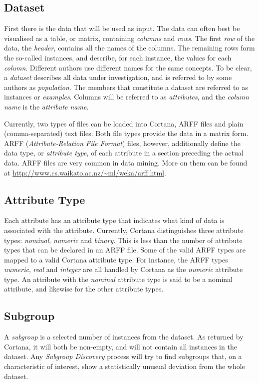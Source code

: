 \documentclass{article}
\begin{document}
\subsection{Dataset}
\label{preliminaries:dataset}
First there is the data that will be used as input.
The data can often best be visualised as a table, or matrix, containing \emph{columns} and \emph{rows}.
The first \emph{row} of the data, the \emph{header}, contains all the names of the columns.
The remaining rows form the so-called instances, and describe, for each instance, the values for each \emph{column}.
Different authors use different names for the same concepts.
To be clear, a \emph{dataset} describes all data under investigation, and is referred to by some authors as \emph{population}.
The members that constitute a dataset are referred to as instances or \emph{examples}.
Columns will be referred to as \emph{attributes}, and the \emph{column name} is the \emph{attribute name}.

Currently, two types of files can be loaded into Cortana, ARFF files and plain (comma-separated) text files.
Both file types provide the data in a matrix form.
ARFF (\emph{Attribute-Relation File Format}) files, however, additionally define the data type, or \emph{attribute type}, of each attribute in a section preceding the actual data.
ARFF files are very common in data mining.
More on them can be found at \url{http://www.cs.waikato.ac.nz/~ml/weka/arff.html}.



\subsection{Attribute Type}
\label{preliminaries:attribute-type}
Each attribute has an attribute type that indicates what kind of data is associated with the attribute.
Currently, Cortana distinguishes three attribute types: \emph{nominal}, \emph{numeric} and \emph{binary}.
This is less than the number of attribute types that can be declared in an ARFF file.
Some of the valid ARFF types are mapped to a valid Cortana attribute type.
For instance, the ARFF types \emph{numeric}, \emph{real} and \emph{integer} are all handled by Cortana as the \emph{numeric} attribute type.
An attribute with the \emph{nominal} attribute type is said to be a nominal attribute, and likewise for the other attribute types.



\subsection{Subgroup}
\label{preliminaries:subgroup}
A \emph{subgroup} is a selected number of instances from the dataset.
As returned by Cortana, it will both be non-empty, and will not contain all instances in the dataset.
Any \emph{Subgroup Discovery} process will try to find subgroups that, on a characteristic of interest, show a statistically unusual deviation from the whole dataset.
\end{document}
